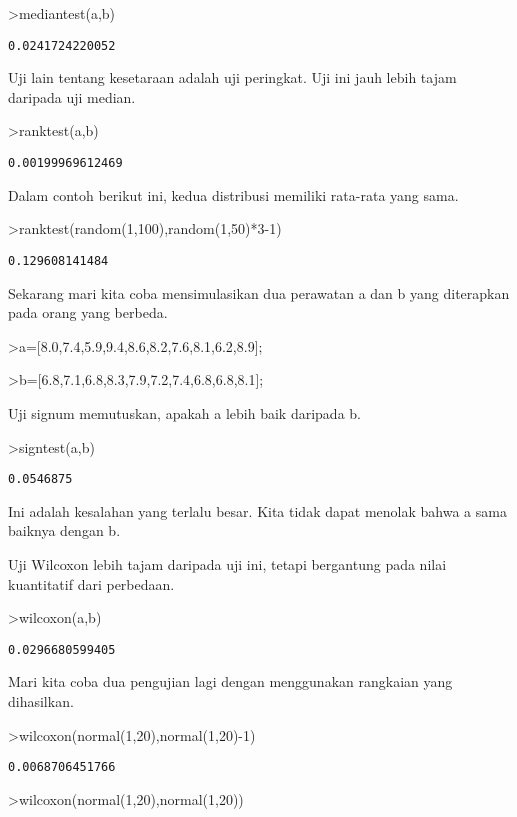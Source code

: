 \documentclass[
]{book}
\begin{document}
\textgreater mediantest(a,b)

\begin{verbatim}
0.0241724220052
\end{verbatim}

Uji lain tentang kesetaraan adalah uji peringkat. Uji ini jauh lebih tajam daripada uji median.

\textgreater ranktest(a,b)

\begin{verbatim}
0.00199969612469
\end{verbatim}

Dalam contoh berikut ini, kedua distribusi memiliki rata-rata yang sama.

\textgreater ranktest(random(1,100),random(1,50)*3-1)

\begin{verbatim}
0.129608141484
\end{verbatim}

Sekarang mari kita coba mensimulasikan dua perawatan a dan b yang diterapkan pada orang yang berbeda.

\textgreater a={[}8.0,7.4,5.9,9.4,8.6,8.2,7.6,8.1,6.2,8.9{]};

\textgreater b={[}6.8,7.1,6.8,8.3,7.9,7.2,7.4,6.8,6.8,8.1{]};

Uji signum memutuskan, apakah a lebih baik daripada b.

\textgreater signtest(a,b)

\begin{verbatim}
0.0546875
\end{verbatim}

Ini adalah kesalahan yang terlalu besar. Kita tidak dapat menolak bahwa a sama baiknya dengan b.

Uji Wilcoxon lebih tajam daripada uji ini, tetapi bergantung pada nilai kuantitatif dari perbedaan.

\textgreater wilcoxon(a,b)

\begin{verbatim}
0.0296680599405
\end{verbatim}

Mari kita coba dua pengujian lagi dengan menggunakan rangkaian yang dihasilkan.

\textgreater wilcoxon(normal(1,20),normal(1,20)-1)

\begin{verbatim}
0.0068706451766
\end{verbatim}

\textgreater wilcoxon(normal(1,20),normal(1,20))
\end{document}
